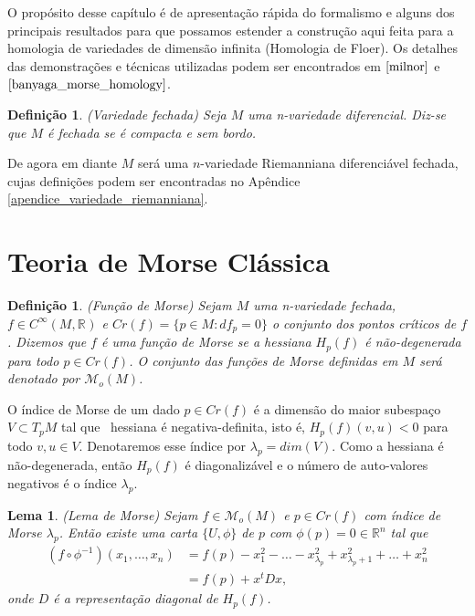 \documentclass[12pt]{book}
\newtheorem{lema}[teorema]{Lema}
\newtheorem{definicao}[teorema]{Definição}
\newcommand{\funcoesmorse}[1]{\mathcal{M}_{o}(#1)}
\newcommand{\funcoessuaves}[1]{C^{\infty}(#1, \real{})}
\newcommand{\pontoscriticos}[1]{\textit{Cr}(#1)}
\newcommand{\real}[1]{\mathbb{R}^{#1}}
\begin{document}
	O propósito desse capítulo é de apresentação rápida do formalismo e alguns dos principais resultados para que possamos estender a construção aqui feita para a homologia de variedades de dimensão infinita (Homologia de Floer). Os detalhes das demonstrações e técnicas utilizadas podem ser encontrados em $\cite{milnor}$ e $\cite{banyaga_morse_homology}$.
	
	\begin{definicao}\label{definicao_variedade_fechada}
		(Variedade fechada) Seja $M$ uma n-variedade diferencial. Diz-se que $M$ é fechada se é compacta e sem bordo.
	\end{definicao}
	
	De agora em diante $M$ será uma $n$-variedade Riemanniana diferenciável fechada, cujas definições podem ser encontradas no Apêndice \ref{apendice_variedade_riemanniana}.
	
	\section{Teoria de Morse Clássica}\label{secao_morse_classica}
	
	\begin{definicao}
		(Função de Morse) Sejam $M$ uma n-variedade fechada, $f \in \funcoessuaves{M}$ e $\pontoscriticos{f} = \{p \in M: df_{p} = 0\}$ o conjunto dos pontos críticos de $f$. Dizemos que $f$ é uma função de Morse se a hessiana $H_{p}(f)$ é não-degenerada para todo $p \in \pontoscriticos{f}$. O conjunto das funções de Morse definidas em $M$ será denotado por $\funcoesmorse{M}$. 
	\end{definicao}

	O índice de Morse de um dado $p \in \pontoscriticos{f}$ é a dimensão do maior subespaço $V\subset T_{p}M $ tal que \ hessiana é negativa-definita, isto é, $H_{p}(f)(v,u)<0$ para todo $v,u \in V$. Denotaremos esse índice por $\lambda_{p} = dim(V)$. Como a hessiana é não-degenerada, então $H_{p}(f)$ é diagonalizável e o número de auto-valores negativos é o índice $\lambda_{p}$.
	
	\begin{lema}
		(Lema de Morse) Sejam $f \in \funcoesmorse{M}$ e $p \in \pontoscriticos{f}$ com índice de Morse $\lambda_{p}$. Então existe uma carta $\{U, \phi\}$ de $p$ com $\phi(p)=0 \in \real{n}$ tal que 
		$$
		\begin{aligned}
		(f\circ \phi^{-1})(x_{1}, \dots, x_{n}) &= f(p)-x_{1}^{2}-\dots -x^{2}_{\lambda_{p}}+x^{2}_{\lambda_{p}+1}+\dots + x^{2}_{n}
		\\
		&=f(p)+x^{t}Dx,
		\end{aligned}
		$$
		onde $D$ é a representação diagonal de $H_{p}(f)$.
	\end{lema}
	
\end{document}
